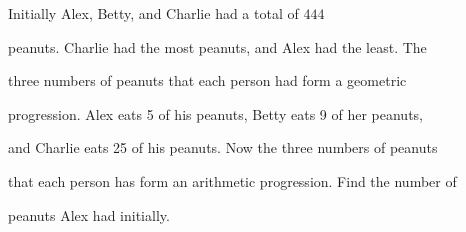 Initially Alex, Betty, and Charlie had a total of $444$

 peanuts. Charlie had the most peanuts, and Alex had the least. The 

three numbers of peanuts that each person had form a geometric 

progression. Alex eats 5 of his peanuts, Betty eats 9 of her peanuts, 

and Charlie eats 25 of his peanuts. Now the three numbers of peanuts 

that each person has form an arithmetic progression. Find the number of 

peanuts Alex had initially.